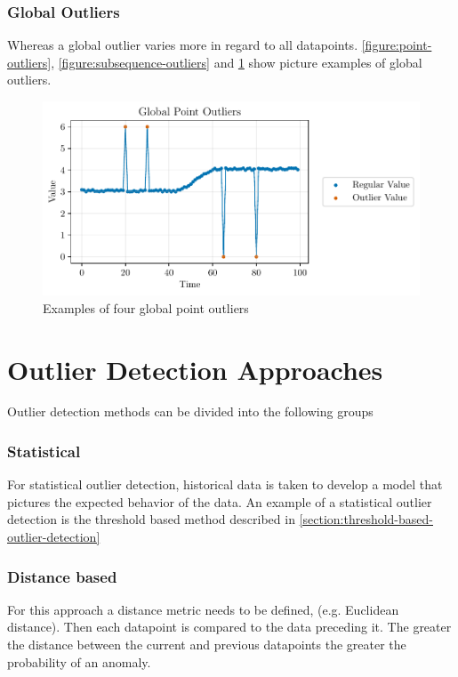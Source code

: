 \subsubsection{Global Outliers}
Whereas a global outlier varies more in regard to all datapoints. \autoref{figure:point-outliers}, \ref{figure:subsequence-outliers} and \ref{figure:global-point-outliers} show picture examples of global outliers.
\cite{blazquez-garciaReviewOutlierAnomaly2020}
\begin{figure}[H]
  \centering
  \includegraphics{./plots/pdfs/global_point_outliers.pdf}
  \caption{Examples of four global point outliers}
  \label{figure:global-point-outliers}
\end{figure}

\section{Outlier Detection Approaches}\label{section:outlier-detection-approaches}
Outlier detection methods can be divided into the following groups
\subsubsection{Statistical}
For statistical outlier detection, historical data is taken to develop a model that pictures the expected behavior of the data. An example of a statistical outlier detection is the threshold based method described in \autoref{section:threshold-based-outlier-detection} \cite{cookAnomalyDetectionIoT2020, giannoniAnomalyDetectionModels2018}

\subsubsection{Distance based}
For this approach a distance metric needs to be defined, (e.g. Euclidean distance). Then each datapoint is compared to the data preceding it. The greater the distance between the current and previous datapoints the greater the probability of an anomaly. \cite{cookAnomalyDetectionIoT2020, giannoniAnomalyDetectionModels2018, chandolaAnomalyDetectionSurvey2009}

